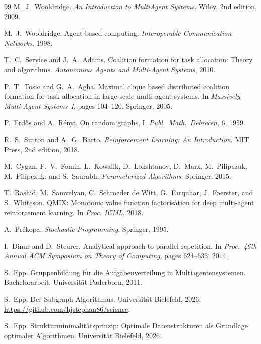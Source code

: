 ﻿\documentclass[a4paper,12pt]{article}
\theoremstyle{definition}
\begin{document}
\begin{thebibliography}{99}
M.\ J.\ Wooldridge.
\newblock \textit{An Introduction to MultiAgent Systems}.
\newblock Wiley, 2nd edition, 2009.

M.\ J.\ Wooldridge.
\newblock Agent-based computing.
\newblock \textit{Interoperable Communication Networks}, 1998.

T.\ C.\ Service and J.\ A.\ Adams.
\newblock Coalition formation for task allocation: Theory and algorithms.
\newblock \textit{Autonomous Agents and Multi-Agent Systems}, 2010.

P.\ T.\ Tosic and G.\ A.\ Agha.
\newblock Maximal clique based distributed coalition formation for task
         allocation in large-scale multi-agent systems.
\newblock In \textit{Massively Multi-Agent Systems~I}, pages 104--120.
         Springer, 2005.

P.\ Erd\H{o}s and A.\ R\'{e}nyi.
\newblock On random graphs, I.
\newblock \textit{Publ.\ Math.\ Debrecen}, 6, 1959.

R.\ S.\ Sutton and A.\ G.\ Barto.
\newblock \textit{Reinforcement Learning: An Introduction}.
\newblock MIT Press, 2nd edition, 2018.

M.\ Cygan, F.\ V.\ Fomin, L.\ Kowalik, D.\ Lokshtanov, D.\ Marx,
M.\ Pilipczuk, M.\ Pilipczuk, and S.\ Saurabh.
\newblock \textit{Parameterized Algorithms}.
\newblock Springer, 2015.

T.\ Rashid, M.\ Samvelyan, C.\ Schroeder de Witt, G.\ Farquhar, J.\ Foerster,
and S.\ Whiteson.
\newblock QMIX: Monotonic value function factorisation for deep multi-agent
         reinforcement learning.
\newblock In \textit{Proc. ICML}, 2018.

A.\ Pr\'{e}kopa.
\newblock \textit{Stochastic Programming}.
\newblock Springer, 1995.

I.\ Dinur and D.\ Steurer.
\newblock Analytical approach to parallel repetition.
\newblock In \textit{Proc.\ 46th Annual ACM Symposium on Theory of Computing},
         pages 624--633, 2014.

S.\ Epp.
\newblock Gruppenbildung f\"{u}r die Aufgabenverteilung in Multiagentensystemen.
\newblock Bachelorarbeit, Universit\"{a}t Paderborn, 2011.

S.\ Epp.
\newblock Der Subgraph Algorithmus.
\newblock Universit\"{a}t Bielefeld, 2026.
\newblock \url{https://github.com/hjstephan86/science}.

S.\ Epp.
\newblock Strukturminimalit\"{a}tsprinzip: Optimale Datenstrukturen als
         Grundlage optimaler Algorithmen.
\newblock Universit\"{a}t Bielefeld, 2026.

\end{thebibliography}
\end{document}
